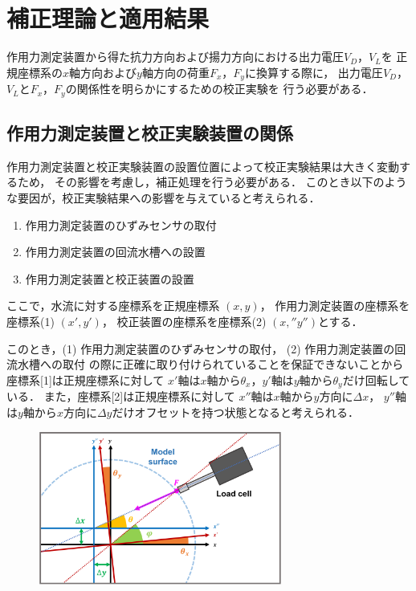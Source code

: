 \documentclass[twocolumn,a4j]{jsarticle}
\begin{document}
\newpage

\section{補正理論と適用結果}

作用力測定装置から得た抗力方向および揚力方向における出力電圧$V_D$，$V_L$を
正規座標系の$x$軸方向および$y$軸方向の荷重$F_x$，$F_y$に換算する際に，
出力電圧$V_D$，$V_L$と$F_x$，$F_y$の関係性を明らかにするための校正実験を
行う必要がある．\\

\subsection{作用力測定装置と校正実験装置の関係}
作用力測定装置と校正実験装置の設置位置によって校正実験結果は大きく変動するため，
その影響を考慮し，補正処理を行う必要がある．
このとき以下のような要因が，校正実験結果への影響を与えていると考えられる．

\begin{enumerate}[(1)]
    \item 作用力測定装置のひずみセンサの取付
    \item 作用力測定装置の回流水槽への設置
    \item 作用力測定装置と校正装置の設置
\end{enumerate}

\newpage

ここで，水流に対する座標系を正規座標系 $(x,y)$，
作用力測定装置の座標系を座標系(1) $(x',y')$，
校正装置の座標系を座標系(2) $(x,'' y'')$とする．

このとき，(1) 作用力測定装置のひずみセンサの取付，
(2) 作用力測定装置の回流水槽への取付 の際に正確に取り付けられていることを保証できないことから
座標系[1]は正規座標系に対して
$x'$軸は$x$軸から$\theta_x$，$y'$軸は$y$軸から$\theta_y$だけ回転している．
また，座標系[2]は正規座標系に対して
$x''$軸は$x$軸から$y$方向に$\Delta x$，
$y''$軸は$y$軸から$x$方向に$\Delta y$だけオフセットを持つ状態となると考えられる．

\begin{figure}[htbp]
    \footnotesize
    \begin{center}
        \includegraphics[width=80mm]{../images/31-1.png}
        \caption{}
    \end{center}
\end{figure}
\end{document}
